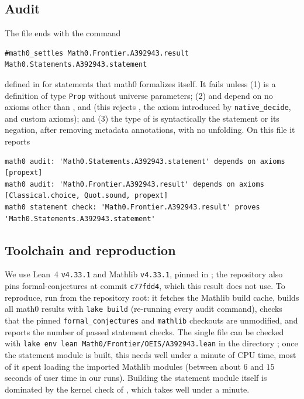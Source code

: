 \documentclass[11pt]{amsart}
\theoremstyle{plain}
\theoremstyle{definition}
\begin{document}
\subsection*{Audit}
The file ends with the command
\begin{lstlisting}
#math0_settles Math0.Frontier.A392943.result Math0.Statements.A392943.statement
\end{lstlisting}
defined in  for statements that math0 formalizes itself. It fails unless (1)  is a definition of type \texttt{Prop} without universe parameters; (2)  and  depend on no axioms other than ,  and  (this rejects , the axiom  introduced by \texttt{native\_decide}, and custom axioms); and (3) the type of  is syntactically the statement or its negation, after removing metadata annotations, with no unfolding. On this file it reports
\begin{lstlisting}
math0 audit: 'Math0.Statements.A392943.statement' depends on axioms [propext]
math0 audit: 'Math0.Frontier.A392943.result' depends on axioms [Classical.choice, Quot.sound, propext]
math0 statement check: 'Math0.Frontier.A392943.result' proves 'Math0.Statements.A392943.statement'
\end{lstlisting}

\subsection*{Toolchain and reproduction}
We use Lean~4 \cite{Lean4} \texttt{v4.33.1} and Mathlib \cite{Mathlib} \texttt{v4.33.1}, pinned in ; the repository also pins formal-conjectures \cite{FC} at commit \texttt{c77fdd4}, which this result does not use. To reproduce, run  from the repository root: it fetches the Mathlib build cache, builds all math0 results with \texttt{lake build} (re-running every audit command), checks that the pinned \texttt{formal\_conjectures} and \texttt{mathlib} checkouts are unmodified, and reports the number of passed statement checks. The single file can be checked with \texttt{lake env lean Math0/Frontier/OEIS/A392943.lean} in the directory ; once the statement module is built, this needs well under a minute of CPU time, most of it spent loading the imported Mathlib modules (between about $6$ and $15$ seconds of user time in our runs). Building the statement module itself is dominated by the kernel check of , which takes well under a minute.
\end{document}
